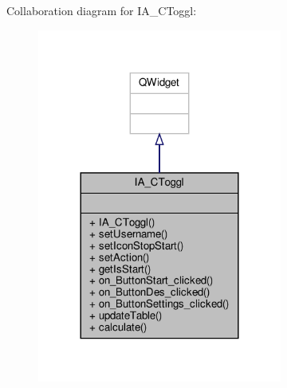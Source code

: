 Collaboration diagram for I\+A\+\_\+\+C\+Toggl\+:
\nopagebreak
\begin{figure}[H]
\begin{center}
\leavevmode
\includegraphics[width=228pt]{classIA__CToggl__coll__graph}
\end{center}
\end{figure}
